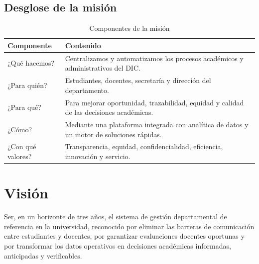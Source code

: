 \subsection{Desglose de la misión}
\begin{table}[H]
\centering
\caption{Componentes de la misión}
\label{tab:mision-desglose}
\begin{tabularx}{\textwidth}{@{}l X@{}}
\toprule
\rowcolor{verdeClaro}
\textbf{Componente} & \textbf{Contenido} \\
\midrule
¿Qué hacemos? & Centralizamos y automatizamos los procesos académicos y
administrativos del \ac{DIC}. \\
¿Para quién? & Estudiantes, docentes, secretaría y dirección del departamento. \\
¿Para qué? & Para mejorar oportunidad, trazabilidad, equidad y calidad de las
decisiones académicas. \\
¿Cómo? & Mediante una plataforma integrada con analítica de datos y un motor de
soluciones rápidas. \\
¿Con qué valores? & Transparencia, equidad, confidencialidad, eficiencia,
innovación y servicio. \\
\bottomrule
\end{tabularx}
\end{table}

\section{Visión}

\begin{cajaNota}[Visión]
Ser, en un horizonte de tres años, el sistema de gestión departamental de
referencia en la universidad, reconocido por eliminar las barreras de
comunicación entre estudiantes y docentes, por garantizar evaluaciones docentes
oportunas y por transformar los datos operativos en decisiones académicas
informadas, anticipadas y verificables.
\end{cajaNota}


